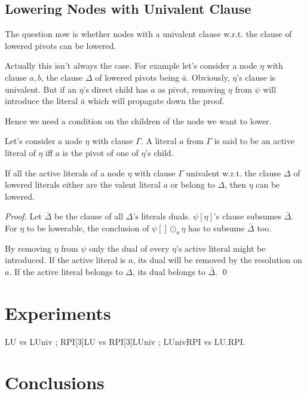 \documentclass{llncs}
\newenvironment{jogo}{\color{teal}}{}
\begin{document}
\subsection{Lowering Nodes with Univalent Clause}

The question now is whether nodes with a univalent clause w.r.t. the clause of
lowered pivots can be lowered.

Actually this isn't always the case. For example let's consider a node
$\eta$ with clause $a,b$, the clause $\Delta$ of lowered pivots being
$\bar{a}$. Obviously, $\eta$'s clause is univalent. But if an $\eta$'s
direct child has $a$ as pivot, removing $\eta$ from $\psi$ will introduce
the literal $\bar{a}$ which will propagate down the proof.

Hence we need a condition on the children of the node we want to lower.

\begin{definition}
Let's consider a node $\eta$ with clause $\Gamma$. A literal $a$ from
$\Gamma$ is said to be an active literal of $\eta$ iff $a$ is the pivot of
one of $\eta$'s child.
\end{definition}

\begin{theorem}
If all the active literals of a node $\eta$ with clause $\Gamma$ univalent
w.r.t. the clause $\Delta$ of lowered literals either are the valent
literal $a$ or belong to $\Delta$, then $\eta$ can be lowered.
\end{theorem}

\begin{proof}
Let $\bar{\Delta}$ be the clause of all $\Delta$'s literals duals.
$\psi[\eta]$'s clause subsumes $\bar{\Delta}$. For $\eta$ to be lowerable,
the conclusion of $\psi[] \odot_a \eta$ has to subsume $\bar{\Delta}$ too.

By removing $\eta$ from $\psi$ only the dual of every $\eta$'s active literal
might be introduced. If the active literal is $a$, its dual will be removed
by the resolution on $a$. If the active literal belongs to $\Delta$, its
dual belongs to $\bar{\Delta}$.
\qed
\end{proof}

\section{Experiments}

\begin{jogo}
LU vs LUniv ; RPI[3]LU vs RPI[3]LUniv ; LUnivRPI vs LU.RPI.
\end{jogo}

\section{Conclusions}



\end{document}

